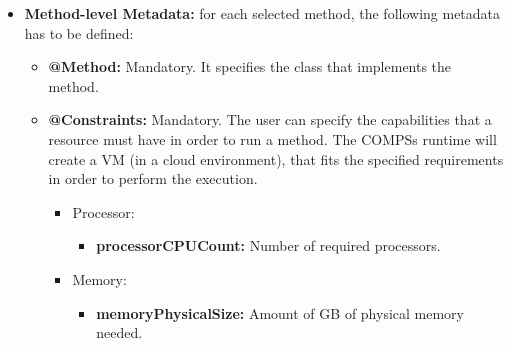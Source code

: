 \begin{itemize}
 \item {\bf Method-level Metadata:} for each selected method, the following metadata has to be defined:
       \begin{itemize}
         \item {\bf @Method:} Mandatory. It specifies the class that implements the method.
         \item {\bf @Constraints:} Mandatory. The user can specify the capabilities that a resource must have in order
               to run a method. The COMPSs runtime will create a VM (in a cloud environment), that fits the
               specified requirements in order to perform the execution.
               \begin{itemize}
                 \item Processor:
                       \begin{itemize}
                         \item {\bf processorCPUCount:} Number of required processors.
                       \end{itemize}
                \item Memory:
                       \begin{itemize}
                         \item {\bf memoryPhysicalSize:} Amount of GB of physical memory needed.
                       \end{itemize}
               \end{itemize}

       \end{itemize}


\end{itemize}
